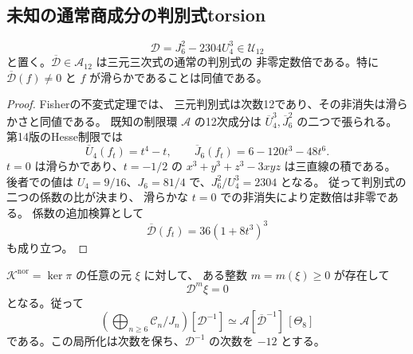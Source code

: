 \subsection{未知の通常商成分の判別式torsion}

\begin{lemma}[正規化済み単元からの三元判別式]
\label{lem:v17-unit-discriminant}
\[
 \mathscr D=J_6^2-2304U_4^3\in\mathcal U_{12}
\]
と置く。$\overline{\mathscr D}\in\mathcal A_{12}$ は三元三次式の通常の判別式の
非零定数倍である。特に $\overline{\mathscr D}(f)\ne0$ と
$f$ が滑らかであることは同値である。
\end{lemma}

\begin{proof}
Fisherの不変式定理\cite[Theorem~4.4]{Fisher2008}では、
三元判別式は次数12であり、その非消失は滑らかさと同値である。
既知の制限環 $\mathcal A$ の12次成分は
$\overline U_4^3,\overline J_6^2$ の二つで張られる。
第14版のHesse制限では
\[
 \overline U_4(f_t)=t^4-t,\qquad
 \overline J_6(f_t)=6-120t^3-48t^6.
\]
$t=0$ は滑らかであり、$t=-1/2$ の
$x^3+y^3+z^3-3xyz$ は三直線の積である。
後者での値は $U_4=9/16$、$J_6=81/4$ で、$J_6^2/U_4^3=2304$ となる。
従って判別式の二つの係数の比が決まり、
滑らかな $t=0$ での非消失により定数倍は非零である。
係数の追加検算として
\[
 \overline{\mathscr D}(f_t)=36(1+8t^3)^3
\]
も成り立つ。
\end{proof}

\begin{theorem}[横断射影は判別式可逆化後に同型となる]
\label{thm:v17-normal-kernel-discriminant-torsion}
$\mathcal K^{\mathrm{nor}}=\ker\pi$ の任意の元 $\xi$ に対して、
ある整数 $m=m(\xi)\ge0$ が存在して
\begin{equation}\label{eq:v17-normal-kernel-discriminant-torsion}
 \mathscr D^m\xi=0
\end{equation}
となる。従って
\begin{equation}\label{eq:v17-discriminant-localized-quotient}
 \left(\bigoplus_{n\ge6}\mathcal C_n/J_n\right)[\mathscr D^{-1}]
 \simeq
 \mathcal A[\overline{\mathscr D}^{-1}]\,[\Theta_8]
\end{equation}
である。この局所化は次数を保ち、$\mathscr D^{-1}$ の次数を $-12$ とする。
\end{theorem}

